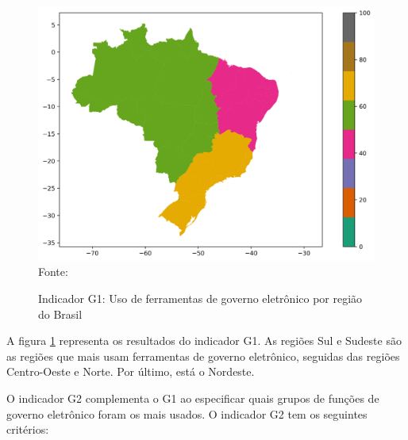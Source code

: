 \begin{figure}[H]
	\centering
	\caption{Indicador G1: Uso de ferramentas de governo eletrônico por região do Brasil}
	\includegraphics[width=1\linewidth]{figuras/mapa_coropleto_tic_domicilio_g1}
	\label{fig:mapa_coropleto_tic_domicilio_g1}
	\footnotesize{Fonte: \cite{tic_domicilios_2024_g1}}
\end{figure}

A figura \ref{fig:mapa_coropleto_tic_domicilio_g1} representa os resultados do indicador G1. As regiões Sul e Sudeste são as regiões que mais usam ferramentas de governo eletrônico, seguidas das regiões Centro-Oeste e Norte. Por último, está o Nordeste.

O indicador G2 complementa o G1 ao especificar quais grupos de funções de governo eletrônico foram os mais usados. O indicador G2 tem os seguintes critérios:

